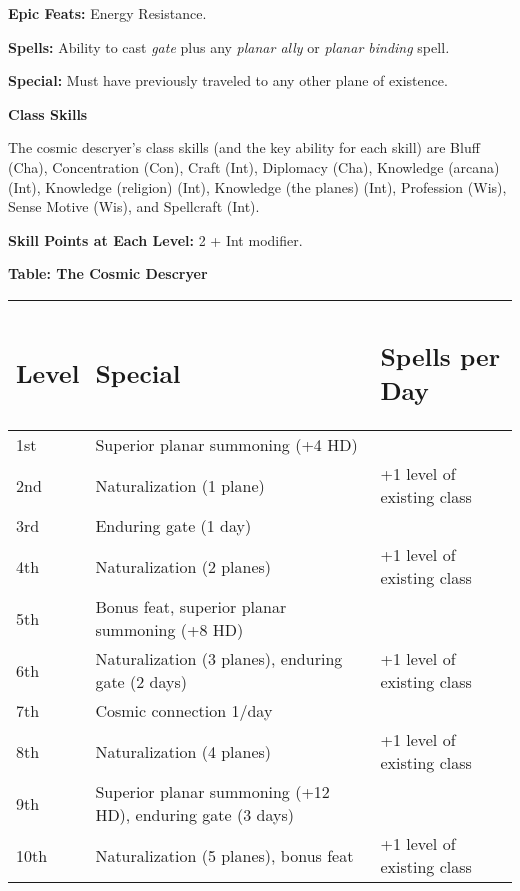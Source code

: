 \documentclass{article}
\begin{document}
\textbf{Epic Feats:} Energy Resistance. 

\textbf{Spells:} Ability to cast \textit{gate} plus any \textit{planar ally} or 
\textit{planar binding }spell\textit{.}

\textbf{Special:} Must have previously traveled to any other plane of existence. 

\textbf{Class Skills}

The cosmic descryer's class skills (and the key ability for each skill) are Bluff 
(Cha), Concentration (Con), Craft (Int), Diplomacy (Cha), Knowledge (arcana) (Int), 
Knowledge (religion) (Int), Knowledge (the planes) (Int), Profession (Wis), Sense 
Motive (Wis), and Spellcraft (Int). 

\textbf{Skill Points at Each Level:} 2 + Int modifier. 

\vspace{12pt}
\textbf{Table: The Cosmic Descryer }

\begin{tabular}{|>{\raggedright}p{23pt}|>{\raggedright}p{205pt}|>{\raggedright}p{85pt}|}
\hline
\subsection*{L\textbf{evel}} & \subsection*{S\textbf{pecial}} & \subsection*{S\textbf{pells 
per Day }}\tabularnewline
\hline
1st & Superior planar summoning (+4 HD)  & \tabularnewline
\hline
2nd & Naturalization (1 plane) & +1 level of existing class \tabularnewline
\hline
3rd & Enduring gate (1 day)  & \tabularnewline
\hline
4th & Naturalization (2 planes) & +1 level of existing class \tabularnewline
\hline
5th & Bonus feat, superior planar summoning (+8 HD)  & \tabularnewline
\hline
6th & Naturalization (3 planes), enduring gate (2 days) & +1 level of existing 
class\tabularnewline
\hline
7th & Cosmic connection 1/day  & \tabularnewline
\hline
8th & Naturalization (4 planes) & +1 level of existing class \tabularnewline
\hline
9th & Superior planar summoning (+12 HD), enduring gate (3 days)  & \tabularnewline
\hline
10th & Naturalization (5 planes), bonus feat & +1 level of existing class \tabularnewline
\hline
\end{tabular}
\end{document}
